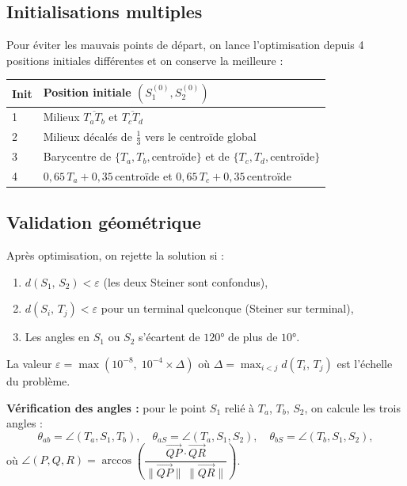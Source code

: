 \documentclass[12pt, a4paper]{article}
\newcommand{\dist}[2]{d\!\left(#1,\,#2\right)}
\begin{document}
\subsection{Initialisations multiples}

Pour éviter les mauvais points de départ, on lance l'optimisation depuis 4 positions
initiales différentes et on conserve la meilleure :

\begin{center}
\begin{tabular}{ll}
\toprule
\textbf{Init} & \textbf{Position initiale $(S_1^{(0)}, S_2^{(0)})$} \\
\midrule
1 & Milieux $\overline{T_a T_b}$ et $\overline{T_c T_d}$ \\
2 & Milieux décalés de $\tfrac{1}{3}$ vers le centroïde global \\
3 & Barycentre de $\{T_a, T_b, \mathrm{centroïde}\}$ et de $\{T_c, T_d, \mathrm{centroïde}\}$ \\
4 & $0{,}65\,T_a + 0{,}35\,\mathrm{centroïde}$ et $0{,}65\,T_c + 0{,}35\,\mathrm{centroïde}$ \\
\bottomrule
\end{tabular}
\end{center}

\subsection{Validation géométrique}

Après optimisation, on rejette la solution si :

\begin{enumerate}
    \item $\dist{S_1}{S_2} < \varepsilon$ \quad (les deux Steiner sont confondus),
    \item $\dist{S_i}{T_j} < \varepsilon$ pour un terminal quelconque \quad (Steiner sur terminal),
    \item Les angles en $S_1$ ou $S_2$ s'écartent de $120°$ de plus de $10°$.
\end{enumerate}

\noindent La valeur $\varepsilon = \max(10^{-8},\; 10^{-4} \times \Delta)$ où
$\Delta = \max_{i < j} \dist{T_i}{T_j}$ est l'échelle du problème.

\textbf{Vérification des angles :} pour le point $S_1$ relié à $T_a$, $T_b$, $S_2$,
on calcule les trois angles :
\[
    \theta_{ab} = \angle(T_a, S_1, T_b),\quad
    \theta_{aS} = \angle(T_a, S_1, S_2),\quad
    \theta_{bS} = \angle(T_b, S_1, S_2),
\]
où $\angle(P, Q, R) = \arccos\!\left(\dfrac{\overrightarrow{QP} \cdot \overrightarrow{QR}}
{\|\overrightarrow{QP}\|\,\|\overrightarrow{QR}\|}\right)$.
\end{document}
